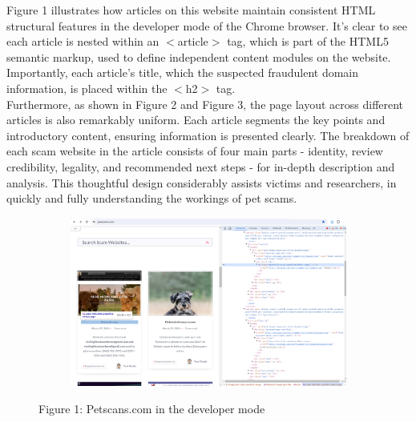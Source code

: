 \documentclass[ oneside,%
                    author={Cassie Qing Tang},
                    degree={BSc},
                     title={An Automated Response System for Disrupting Online Pet Scamming \\ },
                    subtitle={ }]{dissertation}
\begin{document}
Figure 1 illustrates how articles on this website maintain consistent HTML structural features in the developer mode of the Chrome browser. It's clear to see each article is nested within an $<$article$>$ tag, which is part of the HTML5 semantic markup, used to define independent content modules on the website. Importantly, each article's title, which the suspected fraudulent domain information, is placed within the $<$h2$>$ tag. 
\\

Furthermore, as shown in Figure 2 and Figure 3, the page layout across different articles is also remarkably uniform. Each article segments the key points and introductory content, ensuring information is presented clearly. The breakdown of each scam website in the article consists of four main parts - identity, review credibility, legality, and recommended next steps - for in-depth description and analysis. This thoughtful design considerably assists victims and researchers, in quickly and fully understanding the workings of pet scams.
\begin{figure}[!htb]
    \centering
    \begin{subfigure}[b]{0.7\textwidth}
        \includegraphics[width=\linewidth,height=0.28\textheight]{pic/figure1.png}
        \label{fig:petscams}
    \end{subfigure}
    \caption{Figure 1: Petscans.com in the developer mode}
    \label{fig:main1}
\end{figure}
\end{document}

